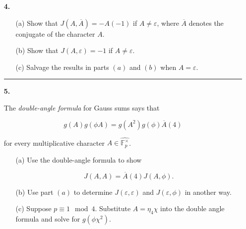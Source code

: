 \documentclass[12pt]{amsart}
\theoremstyle{definition}
\theoremstyle{remark}
\numberwithin{equation}{section}
\def \eps{\varepsilon}
\newcommand{\fphat}
{\widehat{\mathbb{F}_{p}^{\times}}}
\begin{document}
\begin{itemize}
\item[\textbf{4.}]

\begin{itemize}
\item[(a)] Show that $J(A,\overline{A}) = -A(-1)$ if $A \neq \eps$, where $\overline{A}$ denotes the conjugate of the character $A$.

\vspace{4mm}

\item[(b)] Show that $J(A, \eps) = -1$ if $A \neq \eps$.

\vspace{4mm}

\item[(c)] Salvage the results in parts $(a)$ and $(b)$ when $A = \eps$. 
\end{itemize}

\vspace{8mm}

\hrule{}

\vspace{4mm}

\item[\textbf{5.}]

The \textit{double-angle formula} for Gauss sums says that 

$$g(A)g(\phi A) = g(A^{2})g(\phi)\overline{A}(4)$$

\vspace{2mm}

for every multiplicative character $A \in \fphat$.

\vspace{4mm}


\begin{itemize}
\item[(a)] Use the double-angle formula to show 

$$J(A,A) = \overline{A}(4)J(A, \phi).$$

\vspace{4mm}

\item[(b)] Use part $(a)$ to determine $J(\eps, \eps)$ and $J(\eps,\phi)$ in another way.

\vspace{4mm}

\item[(c)] Suppose $p \equiv 1 \mod 4$. Substitute $A = \eta_{4}\chi$ into the double angle formula and solve for $g(\phi \chi^{2})$.
\end{itemize}


\end{itemize}
\end{document}
